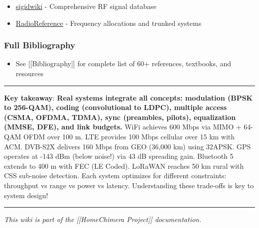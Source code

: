 \begin{itemize}
\tightlist
\item
  \href{https://www.sigidwiki.com/wiki/Signal_Identification_Guide}{sigidwiki}
  - Comprehensive RF signal database
\item
  \href{https://www.radioreference.com/}{RadioReference} - Frequency
  allocations and trunked systems
\end{itemize}

\subsubsection{Full Bibliography}\label{full-bibliography}

\begin{itemize}
\tightlist
\item
  See {[}{[}Bibliography{]}{]} for complete list of 60+ references,
  textbooks, and resources
\end{itemize}

\begin{center}\rule{0.5\linewidth}{0.5pt}\end{center}

\textbf{Key takeaway}: \textbf{Real systems integrate all concepts:
modulation (BPSK to 256-QAM), coding (convolutional to LDPC), multiple
access (CSMA, OFDMA, TDMA), sync (preambles, pilots), equalization
(MMSE, DFE), and link budgets.} WiFi achieves 600 Mbps via MIMO + 64-QAM
OFDM over 100 m. LTE provides 100 Mbps cellular over 15 km with ACM.
DVB-S2X delivers 160 Mbps from GEO (36,000 km) using 32APSK. GPS
operates at -143 dBm (below noise!) via 43 dB spreading gain. Bluetooth
5 extends to 400 m with FEC (LE Coded). LoRaWAN reaches 50 km rural with
CSS sub-noise detection. Each system optimizes for different
constraints: throughput vs range vs power vs latency. Understanding
these trade-offs is key to system design!

\begin{center}\rule{0.5\linewidth}{0.5pt}\end{center}

\emph{This wiki is part of the {[}{[}Home\textbar Chimera Project{]}{]}
documentation.}
